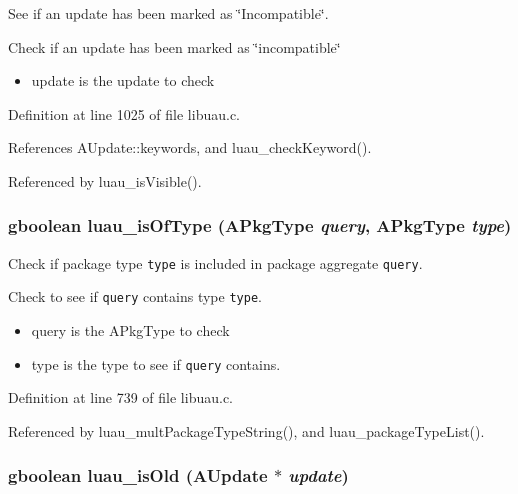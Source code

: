 See if an update has been marked as \char`\"{}Incompatible\char`\"{}. 

Check if an update has been marked as \char`\"{}incompatible\char`\"{}

\begin{itemize}
\item update is the update to check 
\end{itemize}


Definition at line 1025 of file libuau.c.

References AUpdate::keywords, and luau\_\-check\-Keyword().

Referenced by luau\_\-is\-Visible().
\subsubsection{\setlength{\rightskip}{0pt plus 5cm}gboolean luau\_\-is\-Of\-Type ({\bf APkg\-Type} {\em query}, {\bf APkg\-Type} {\em type})}\label{libuau_8h_a74}


Check if package type {\tt type} is included in package aggregate {\tt query}. 

Check to see if {\tt query} contains type {\tt type}.

\begin{itemize}
\item query is the APkg\-Type to check \item type is the type to see if {\tt query} contains. 
\end{itemize}


Definition at line 739 of file libuau.c.

Referenced by luau\_\-mult\-Package\-Type\-String(), and luau\_\-package\-Type\-List().
\subsubsection{\setlength{\rightskip}{0pt plus 5cm}gboolean luau\_\-is\-Old ({\bf AUpdate} $\ast$ {\em update})}\label{libuau_8h_a83}


